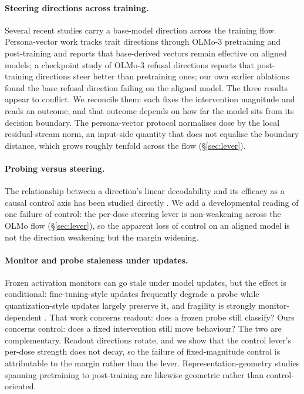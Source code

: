 \documentclass[11pt]{article}
\begin{document}
\paragraph{Steering directions across training.} Several recent studies carry a base-model direction
across the training flow. Persona-vector work \citep{personavectors} tracks trait directions through
OLMo-3 pretraining and post-training and reports that base-derived vectors remain effective on
aligned models; a checkpoint study of OLMo-3 refusal directions \citep{olmoharmfulness} reports that
post-training directions steer better than pretraining ones; our own earlier ablations found the
base refusal direction failing on the aligned model. The three results appear to conflict. We
reconcile them: each fixes the intervention magnitude and reads an outcome, and that outcome depends
on how far the model sits from its decision boundary. The persona-vector protocol normalises dose by
the local residual-stream norm, an input-side quantity that does not equalise the boundary distance,
which grows roughly tenfold across the flow (\S\ref{sec:lever}).

\paragraph{Probing versus steering.} The relationship between a direction's linear decodability and
its efficacy as a causal control axis has been studied directly \citep{decodecontrol}. We add a
developmental reading of one failure of control: the per-dose steering lever is non-weakening across the
OLMo flow (\S\ref{sec:lever}), so the apparent loss of control on an aligned model is not the
direction weakening but the margin widening.

\paragraph{Monitor and probe staleness under updates.} Frozen activation monitors can go stale under
model updates, but the effect is conditional: fine-tuning-style updates frequently degrade a probe
while quantization-style updates largely preserve it, and fragility is strongly monitor-dependent
\citep{monitorstaleness}. That work concerns readout: does a frozen probe still classify? Ours
concerns control: does a fixed intervention still move behaviour? The two are complementary.
Readout directions rotate, and we show
that the control lever's per-dose strength does not decay, so the failure of fixed-magnitude control
is attributable to the margin rather than the lever. Representation-geometry studies spanning
pretraining to post-training \citep{tracinggeometry} are likewise geometric rather than
control-oriented.
\end{document}
